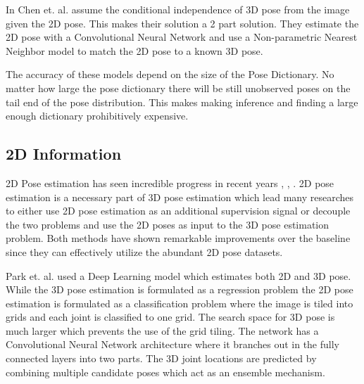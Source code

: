 In \parencite{chen20173d} Chen et. al. assume the conditional independence of 3D pose from the image given the 2D pose. This makes their solution a 2 part solution. They estimate the 2D pose with a Convolutional Neural Network and use a Non-parametric Nearest Neighbor model to match the 2D pose to a known 3D pose. 

The accuracy of these models depend on the size of the Pose Dictionary. No matter how large the pose dictionary there will be still unobserved poses on the tail end of the pose distribution. This makes making inference and finding a large enough dictionary prohibitively expensive.

\subsection{2D Information}

2D Pose estimation has seen incredible progress in recent years \parencite{cao2016realtime}, \parencite{newell2016stacked}, \parencite{iqbal2017posetrack}. 2D pose estimation is a necessary part of 3D pose estimation which lead many researches to either use 2D pose estimation as an additional supervision signal or decouple the two problems and use the 2D poses as input to the 3D pose estimation problem. Both methods have shown remarkable improvements over the baseline since they can effectively utilize the abundant 2D pose datasets. 

Park et. al. \parencite{park20163d} used a Deep Learning model which estimates both 2D and 3D pose. While the 3D pose estimation is formulated as a regression problem the 2D pose estimation is formulated as a classification problem where the image is tiled into grids and each joint is classified to one grid. The search space for 3D pose is much larger which prevents the use of the grid tiling. The network has a Convolutional Neural Network architecture where it branches out in the fully connected layers into two parts. The 3D joint locations are predicted by combining multiple candidate poses which act as an ensemble mechanism.

